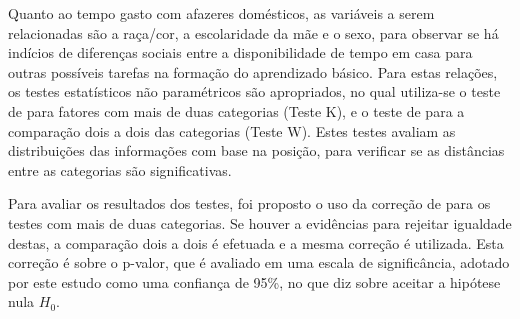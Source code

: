 Quanto ao tempo gasto com afazeres domésticos, as variáveis a serem relacionadas são a raça/cor, a escolaridade da mãe
e o sexo, para observar se há indícios de diferenças sociais entre a disponibilidade de tempo em casa para outras possíveis 
tarefas na formação do aprendizado básico. Para estas relações, os testes estatísticos não paramétricos são apropriados,
no qual utiliza-se o teste de  para fatores com mais de duas categorias (Teste K), e o
teste de  para a comparação dois a dois das categorias (Teste W). Estes testes avaliam as
distribuições das informações com base na posição, para verificar se as distâncias entre as categorias são significativas.


Para avaliar os resultados dos testes, foi proposto o uso da correção de  para os 
testes com mais de duas categorias. Se houver a evidências para rejeitar igualdade destas, a comparação dois a dois é efetuada e a mesma correção
é utilizada. Esta correção é sobre o p-valor, que é avaliado em uma escala de significância, adotado por este estudo
como uma confiança de 95\%, no que diz sobre aceitar a hipótese nula $H_0$.